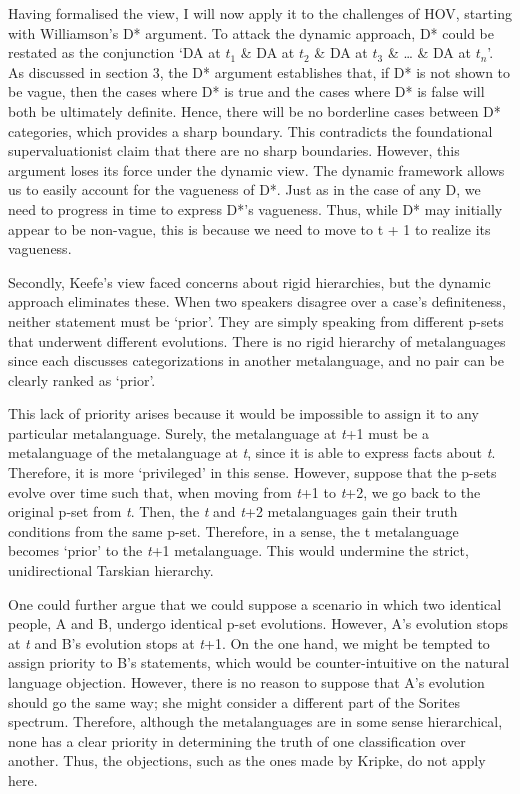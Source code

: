 Having formalised the view, I will now apply it to the challenges of
HOV, starting with Williamson's D* argument. To attack the dynamic
approach, D* could be restated as the conjunction `DA at \(t_{1}\) \& DA
at \(t_{2}\) \& DA at \(t_{3}\) \& \ldots{} \& DA at \(t_{n}\)'. As
discussed in section 3, the D* argument establishes that, if D* is not
shown to be vague, then the cases where D* is true and the cases where
D* is false will both be ultimately definite. Hence, there will be no
borderline cases between D* categories, which provides a sharp boundary.
This contradicts the foundational supervaluationist claim that there are
no sharp boundaries. However, this argument loses its force under the
dynamic view. The dynamic framework allows us to easily account for the
vagueness of D*. Just as in the case of any D, we need to progress in
time to express D*'s vagueness. Thus, while D* may initially appear to
be non-vague, this is because we need to move to t + 1 to realize its
vagueness.

Secondly, Keefe's view faced concerns about rigid hierarchies, but the
dynamic approach eliminates these. When two speakers disagree over a
case's definiteness, neither statement must be `prior'. They are simply
speaking from different p-sets that underwent different evolutions.
There is no rigid hierarchy of metalanguages since each discusses
categorizations in another metalanguage, and no pair can be clearly
ranked as `prior'.

This lack of priority arises because it would be impossible to assign it
to any particular metalanguage. Surely, the metalanguage at \emph{t}+1
must be a metalanguage of the metalanguage at \emph{t}, since it is able
to express facts about \emph{t}. Therefore, it is more `privileged' in
this sense. However, suppose that the p-sets evolve over time such that,
when moving from \emph{t}+1 to \emph{t}+2, we go back to the original
p-set from \emph{t}. Then, the \emph{t} and \emph{t}+2 metalanguages
gain their truth conditions from the same p-set. Therefore, in a sense,
the t metalanguage becomes `prior' to the \emph{t}+1 metalanguage. This
would undermine the strict, unidirectional Tarskian hierarchy.

One could further argue that we could suppose a scenario in which two
identical people, A and B, undergo identical p-set evolutions. However,
A's evolution stops at \emph{t} and B's evolution stops at \emph{t}+1.
On the one hand, we might be tempted to assign priority to B's
statements, which would be counter-intuitive on the natural language
objection. However, there is no reason to suppose that A's evolution
should go the same way; she might consider a different part of the
Sorites spectrum. Therefore, although the metalanguages are in some
sense hierarchical, none has a clear priority in determining the truth
of one classification over another. Thus, the objections, such as the
ones made by Kripke, do not apply here.

